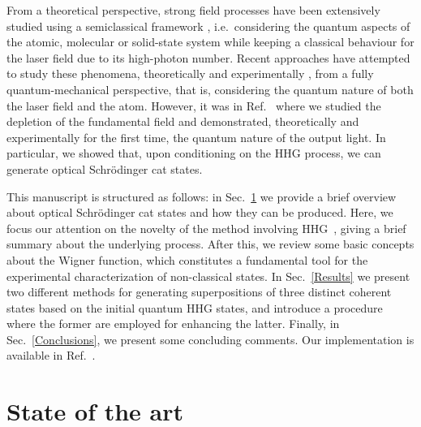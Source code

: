 From a theoretical perspective, strong field processes have been extensively studied using a semiclassical framework \cite{Lewenstein1994}, i.e.~considering the quantum aspects of the atomic, molecular or solid-state system while keeping a classical behaviour for the laser field due to its high-photon number. Recent approaches have attempted to study these phenomena, theoretically \cite{Sundaram1990, Xu1993, Compagno1994, Gauthey1995, Becker1997, Dierstler2008, Kominis2014, Bogatskaya2016spontaneous, Bogatskaya2016polarization, Gonoskov2016, Bogatskaya2017, Bogatskaya2017spectroscopy, Magunov2017, RiveraDean2019, Gorlach2020, Yangaliev2020, Gombkoto2020} and experimentally \cite{Tsatrafyllis2017, Tsatrafyllis2019, Bloch2019}, from a fully quantum-mechanical perspective, that is, considering the quantum nature of both the laser field and the atom. However, it was in Ref.~\cite{Lewenstein2020} where we studied the depletion of the fundamental field and demonstrated, theoretically and experimentally for the first time, the quantum nature of the output light. In particular, we showed that, upon conditioning on the HHG process, we can generate optical Schrödinger cat states.

This manuscript is structured as follows: in Sec.~\ref{State:of:art} we provide a brief overview about optical Schrödinger cat states and how they can be produced. Here, we focus our attention on the novelty of the method involving HHG~\cite{Lewenstein2020}, giving a brief summary about the underlying process. After this, we review some basic concepts about the Wigner function, which constitutes a fundamental tool for the experimental characterization of non-classical states. In Sec.~\ref{Results} we present two different methods for generating superpositions of three distinct coherent states based on the initial quantum HHG states, and introduce a procedure where the former are employed for enhancing the latter. Finally, in Sec.~\ref{Conclusions}, we present some concluding comments. Our implementation is available in Ref.~\cite{FigureMaker}.

\section{State of the art}\label{State:of:art}
